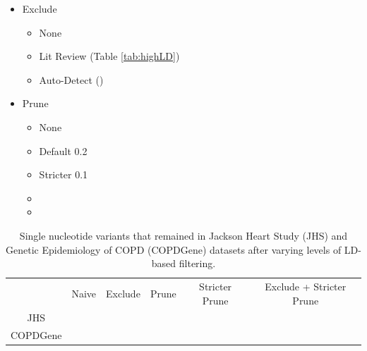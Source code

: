\documentclass[12pt]{article}
\newcommand{\add}[1]{{\color{red}{[... #1 ...]}}}
\begin{document}
\begin{itemize}
\item Exclude
	\begin{itemize}
	\item None
	\item Lit Review (Table \ref{tab:highLD})
	\item Auto-Detect (\add{using Prive package --- implement or skip for now??})
	\end{itemize}
\item Prune
	\begin{itemize}
	\item None
	\item Default 0.2
	\item Stricter 0.1
	\item \add{Stricter 0.05 ???}
	\item \add{Different window size ???}
	\end{itemize}
\end{itemize}

\begin{table}[h]
\begin{tabular}{c|ccccc}
 & Naive & Exclude & Prune & Stricter Prune & Exclude + Stricter Prune \\
JHS & \add{?} &  \add{?} &  \add{?} & \add{?} &  \add{?} \\
COPDGene &  \add{?} &  \add{?} &  \add{?} &  \add{?} &  \add{?} \\
\end{tabular} 
\caption{Single nucleotide variants that remained in Jackson Heart Study (JHS) and Genetic Epidemiology of COPD (COPDGene) datasets after varying levels of LD-based filtering.}
\label{tab:N}
\end{table}
\end{document}
